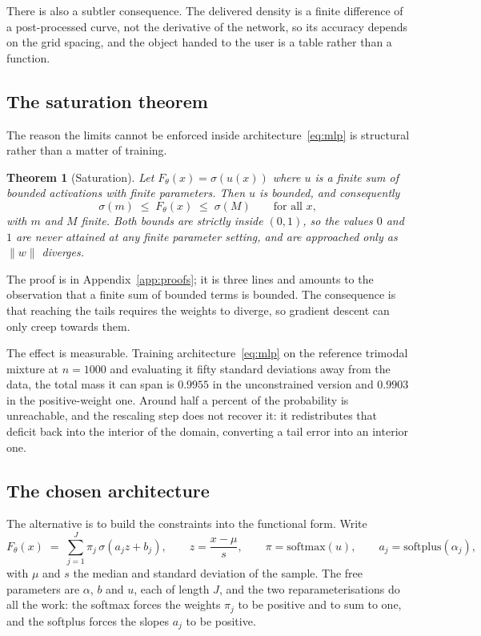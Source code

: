 \documentclass[11pt]{article}
\newtheorem{theorem}{Theorem}
\begin{document}
There is also a subtler consequence. The delivered density is a finite difference of a
post-processed curve, not the derivative of the network, so its accuracy depends on the grid
spacing, and the object handed to the user is a table rather than a function.

\subsection{The saturation theorem}

The reason the limits cannot be enforced inside architecture~\eqref{eq:mlp} is structural
rather than a matter of training.

\begin{theorem}[Saturation]
\label{thm:saturation}
Let $F_\theta(x) = \sigma(u(x))$ where $u$ is a finite sum of bounded activations with finite
parameters. Then $u$ is bounded, and consequently
\[
\sigma(m) \;\le\; F_\theta(x) \;\le\; \sigma(M) \qquad \text{for all } x,
\]
with $m$ and $M$ finite. Both bounds are strictly inside $(0,1)$, so the values $0$ and $1$
are never attained at any finite parameter setting, and are approached only as $\|w\|$
diverges.
\end{theorem}

The proof is in Appendix~\ref{app:proofs}; it is three lines and amounts to the observation
that a finite sum of bounded terms is bounded. The consequence is that reaching the tails
requires the weights to diverge, so gradient descent can only creep towards them.

The effect is measurable. Training architecture~\eqref{eq:mlp} on the reference trimodal
mixture at $n = 1000$ and evaluating it fifty standard deviations away from the data, the
total mass it can span is $0.9955$ in the unconstrained version and $0.9903$ in the
positive-weight one. Around half a percent of the probability is unreachable, and the
rescaling step does not recover it: it redistributes that deficit back into the interior of
the domain, converting a tail error into an interior one.

\subsection{The chosen architecture}

The alternative is to build the constraints into the functional form. Write
\begin{equation}
F_\theta(x) \;=\; \sum_{j=1}^{J} \pi_j\, \sigma\!\left( a_j z + b_j \right),
\qquad z = \frac{x - \mu}{s},
\qquad \pi = \mathrm{softmax}(u), \qquad a_j = \mathrm{softplus}(\alpha_j),
\label{eq:mixture-cdf}
\end{equation}
with $\mu$ and $s$ the median and standard deviation of the sample. The free parameters are
$\alpha$, $b$ and $u$, each of length $J$, and the two reparameterisations do all the work:
the softmax forces the weights $\pi_j$ to be positive and to sum to one, and the softplus
forces the slopes $a_j$ to be positive.
\end{document}
